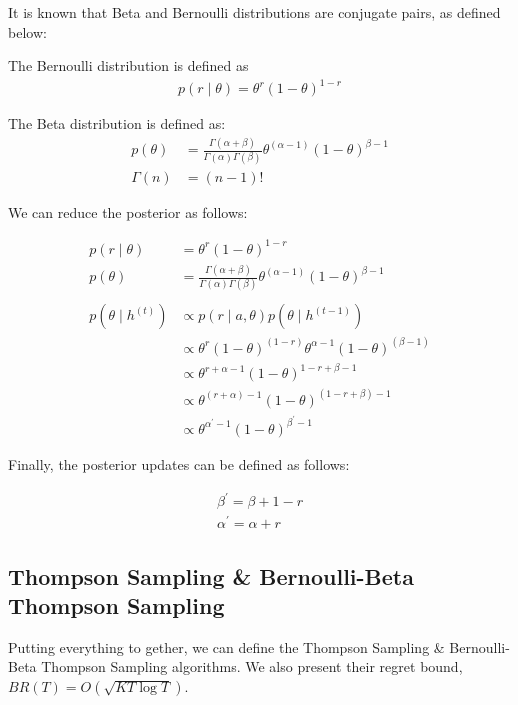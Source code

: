 \documentclass[11pt]{article}
\begin{document}
It is known that Beta and Bernoulli distributions are conjugate pairs, as defined below:

The Bernoulli distribution is defined as
\begin{align}
p(r \mid \theta)=\theta^{r}(1-\theta)^{1-r}
\end{align}

The Beta distribution is defined as:
\begin{align}
p(\theta) &=\frac{\Gamma(\alpha+\beta)}{\Gamma(\alpha) \Gamma(\beta)} \theta^{(\alpha-1)}(1-\theta)^{\beta-1} \\
\Gamma(n) &=(n-1) !
\end{align}

We can reduce the posterior as follows:

\begin{align}
p(r \mid \theta)&=\theta^{r}(1-\theta)^{1-r} \\
p(\theta)&=\frac{\Gamma(\alpha+\beta)}{\Gamma(\alpha) \Gamma(\beta)} \theta^{(\alpha-1)}(1-\theta)^{\beta-1} \\ \\
p\left(\theta \mid h^{(t)}\right) & \propto p(r \mid a, \theta) p\left(\theta \mid h^{(t-1)}\right) \\
& \propto \theta^{r}(1-\theta)^{(1-r)} \theta^{\alpha-1}(1-\theta)^{(\beta-1)} \\
& \propto \theta^{r+\alpha-1}(1-\theta)^{1-r+\beta-1} \\
& \propto \theta^{(r+\alpha)-1}(1-\theta)^{(1-r+\beta)-1} \\
& \propto \theta^{\alpha^{\prime}-1}(1-\theta)^{\beta^{\prime}-1}
\end{align}

Finally, the posterior updates can be defined as follows:

\begin{align}
\beta^{\prime}=\beta+1-r \\
\alpha^{\prime}=\alpha+r
\end{align}

\subsection{Thompson Sampling \& Bernoulli-Beta Thompson Sampling}
Putting everything to gether, we can define the Thompson Sampling \& Bernoulli-Beta Thompson Sampling algorithms. We also present their regret bound, $BR(T)=O(\sqrt{K T \log T})$.
\end{document}

